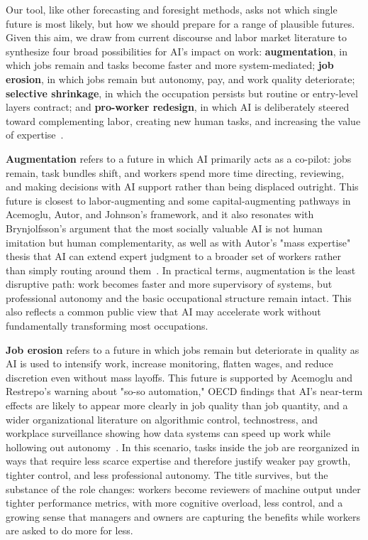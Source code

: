 \documentclass[sigconf,authordraft]{acmart}
\begin{document}
Our tool, like other forecasting and foresight methods, asks not which single future is most likely, but how we should prepare for a range of plausible futures. Given this aim, we draw from current discourse and labor market literature to synthesize four broad possibilities for AI's impact on work: \textbf{augmentation}, in which jobs remain and tasks become faster and more system-mediated; \textbf{job erosion}, in which jobs remain but autonomy, pay, and work quality deteriorate; \textbf{selective shrinkage}, in which the occupation persists but routine or entry-level layers contract; and \textbf{pro-worker redesign}, in which AI is deliberately steered toward complementing labor, creating new human tasks, and increasing the value of expertise~\cite{acemoglu2026building, acemoglu2019automation, oecd2023employment, rogers2023data}.

\textbf{Augmentation} refers to a future in which AI primarily acts as a co-pilot: jobs remain, task bundles shift, and workers spend more time directing, reviewing, and making decisions with AI support rather than being displaced outright. This future is closest to labor-augmenting and some capital-augmenting pathways in Acemoglu, Autor, and Johnson's framework, and it also resonates with Brynjolfsson's argument that the most socially valuable AI is not human imitation but human complementarity, as well as with Autor's "mass expertise" thesis that AI can extend expert judgment to a broader set of workers rather than simply routing around them~\cite{acemoglu2019automation, brynjolfsson2022turing, autor2024applying, malone2018superminds, markoff2015machines}. In practical terms, augmentation is the least disruptive path: work becomes faster and more supervisory of systems, but professional autonomy and the basic occupational structure  remain intact. This also reflects a common public view that AI may accelerate work without fundamentally transforming most occupations.

\textbf{Job erosion} refers to a future in which jobs remain but deteriorate in quality as AI is used to intensify work, increase monitoring, flatten wages, and reduce discretion even without mass layoffs. This future is supported by Acemoglu and Restrepo's warning about "so-so automation," OECD findings that AI's near-term effects are likely to appear more clearly in job quality than job quantity, and a wider organizational literature on algorithmic control, technostress, and workplace surveillance showing how data systems can speed up work while hollowing out autonomy~\cite{acemoglu2019automation, acemoglu2022tasks, oecd2023employment, kellogg2020algorithms, tarafdar2007technostress, dubal2023algorithmic, mateescu2019algorithmic, rogers2023data}. In this scenario, tasks inside the job are reorganized in ways that require less scarce expertise and therefore justify weaker pay growth, tighter control, and less professional autonomy. The title survives, but the substance of the role changes: workers become reviewers of machine output under tighter performance metrics, with more cognitive overload, less control, and a growing sense that managers and owners are capturing the benefits while workers are asked to do more for less.
\end{document}
